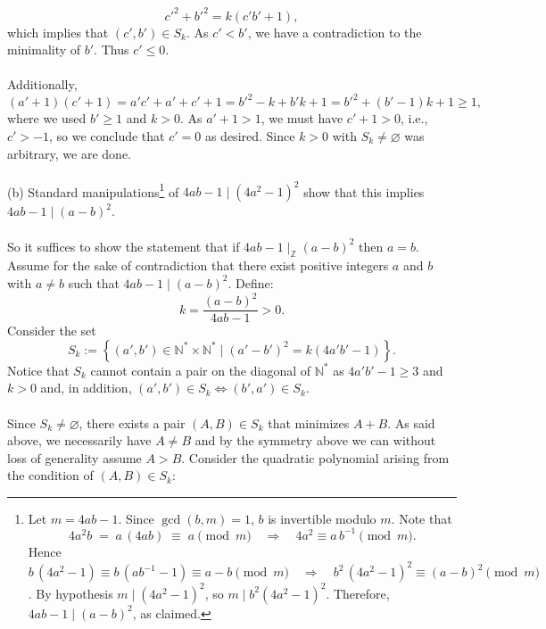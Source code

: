 \begin{solution}
    \[
        c'^2 + b'^2 = k\left(c' b' + 1\right),
    \]
    which implies that \( \left(c',b'\right) \in S_k \). As \( c' < b' \), we have a contradiction to the minimality of \( b' \). Thus \( c' \leq 0 \).
    \\\\
    Additionally,
    \[
        \left(a' + 1\right)\left(c' + 1\right) = a' c' + a' + c' + 1 = b'^2 - k + b' k + 1 = b'^2 + \left(b' - 1\right)k + 1 \geq 1,
    \]
    where we used \( b' \geq 1 \) and \( k > 0 \). As \( a' + 1 > 1 \), we must have \( c' + 1 > 0 \), i.e., \( c' > -1 \), so we conclude that \( c' = 0 \) as desired. Since \( k > 0 \) with \( S_k \neq \varnothing \) was arbitrary, we are done.
    \\\\
    (b) Standard manipulations\footnote{Let \( m = 4ab - 1 \). Since \( \gcd\left(b,m\right)=1 \), \( b \) is invertible modulo \( m \). Note that
    \[
        4a^2b \;=\;a\,\left(4ab\right)\;\equiv\;a\pmod{m} \quad\Longrightarrow\quad 4a^2 \equiv a\,b^{-1} \pmod{m}.
    \]
    Hence \( b\,\left(4a^2 - 1\right)\equiv b\,\left(ab^{-1}-1\right)\equiv a - b \pmod{m} \quad\Longrightarrow\quad b^2\,\left(4a^2 - 1\right)^2 \equiv \left(a-b\right)^2 \pmod{m} \). By hypothesis \( m\mid \left(4a^2-1\right)^2 \), so \( m\mid b^2\left(4a^2-1\right)^2 \). Therefore, \( 4ab-1 \mid \left(a-b\right)^2 \), as claimed.} of \( 4ab - 1 \mid \left(4a^{2} - 1\right)^{2} \) show that this implies \( 4ab - 1 \mid \left(a - b\right)^{2} \). \\
    \\
    So it suffices to show the statement that if \( 4ab - 1 \mid_{\mathbb{Z}} \left(a - b\right)^2 \) then \( a = b \). Assume for the sake of contradiction that there exist positive integers \( a \) and \( b \) with \( a \neq b \) such that \( 4ab - 1 \mid \left(a - b\right)^{2} \). Define:
    \[
        k = \frac{\left(a - b\right)^{2}}{4ab - 1} > 0.
    \]
    Consider the set
    \[
        S_k := \left\{ \left(a', b'\right) \in \mathbb{N}^{*} \times \mathbb{N}^{*} \mid \left(a' - b'\right)^{2} = k\left(4a'b' - 1\right) \right\}.
    \]
    Notice that \( S_k \) cannot contain a pair on the diagonal of \( \mathbb{N}^{*} \) as \( 4a'b' - 1 \geq 3 \) and \( k > 0 \) and, in addition, \( \left(a', b'\right) \in S_k \Leftrightarrow \left(b', a'\right) \in S_k \).
    \\\\
    Since \( S_k \neq \varnothing \), there exists a pair \( \left(A, B\right) \in S_k \) that minimizes \( A + B \). As said above, we necessarily have \( A \neq B \) and by the symmetry above we can without loss of generality assume \( A > B \). Consider the quadratic polynomial arising from the condition of \( \left(A, B\right)\in S_k \):

\end{solution}
